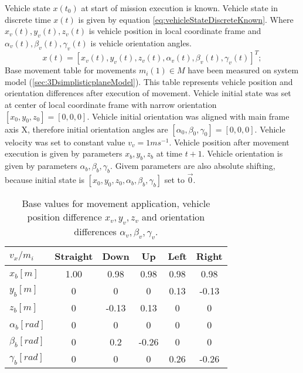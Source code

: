 Vehicle state $x(t_0)$ at start of mission execution is known. Vehicle state in discrete time $x(t)$ is given by equation \ref{eq:vehicleStateDiscreteKnown}. Where $x_v(t),y_v(t),z_v(t)$ is vehicle position in local coordinate frame and $\alpha_v(t),\beta_v(t),\gamma_v(t)$ is vehicle orientation angles.
\begin{equation}\label{eq:vehicleStateDiscreteKnown}
    x(t) = [x_v(t),y_v(t),z_v(t),\alpha_v(t),\beta_v(t),\gamma_v(t)]^T;
\end{equation}
Base movement table for movements $m_i(1)\in M$ have been measured on system model (\ref{sec:3DsimplisticplaneModel}). This table represents vehicle position and orientation differences after execution of movement. Vehicle initial state was set at center of local coordinate frame with narrow orientation $[x_0,y_0,z_0]=[0,0,0]$. Vehicle initial orientation was aligned with main frame axis X, therefore initial orientation angles are $[\alpha_0,\beta_0,\gamma_0] = [0,0,0]$. Vehicle velocity was set to constant value $v_v = 1 ms^{-1}$. Vehicle position after movement execution is given by parameters $x_b,y_b,z_b$ at time $t+1$. Vehicle orientation is given by parameters $\alpha_b,\beta_b,\gamma_b$. Givem parameters are also absolute shifting, because initial state is $[x_0,y_0,z_0,\alpha_b,\beta_b,\gamma_b]$ set to $\vec{0}$.
\begin{table}[H]
    \centering
    \begin{tabular}{|l||c|c|c|c|c|}
    \hline
        $v_x/m_i$           &    Straight  & Down & Up & Left  & Right   \\\hline\hline
        $x_b [m]$           &    1.00	  & 0.98  & 0.98  & 0.98 & 0.98  \\\hline
        $y_b [m]$           &    0	      & 0	  & 0	  & 0.13 & -0.13 \\\hline
        $z_b [m]$           &    0	      & -0.13 & 0.13  &	0	 & 0     \\\hline
        $\alpha_b [rad]$	&    0	      & 0	  & 0	  & 0    & 0     \\\hline
        $\beta_b [rad]$     &    0	      & 0.2   & -0.26 & 0	 & 0     \\\hline
        $\gamma_b [rad]$    &    0	      & 0	  & 0	  & 0.26 & -0.26 \\\hline
    \end{tabular}
    \caption{Base values for movement application, vehicle position difference $x_v,y_v,z_v$ and orientation differences $\alpha_v,\beta_v,\gamma_v$.}
    \label{tab:movementPredictor}
\end{table}
